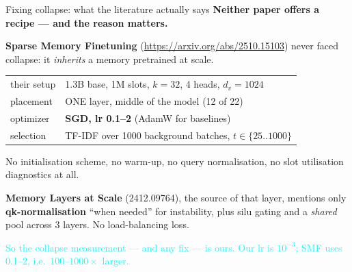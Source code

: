 \documentclass{beamer}
\newcommand{\pierre}[1]{\textcolor{cyan}{#1}}
\begin{document}
\begin{frame}{Fixing collapse: what the literature actually says}
\textbf{Neither paper offers a recipe --- and the reason matters.}

\medskip
\textbf{Sparse Memory Finetuning} (\url{https://arxiv.org/abs/2510.15103}) never
faced collapse: it \emph{inherits} a memory pretrained at scale.
\begin{center}
\begin{tabular}{|l|l|}
\hline
their setup & 1.3B base, 1M slots, $k{=}32$, 4 heads, $d_v{=}1024$ \\
placement & ONE layer, middle of the model (12 of 22) \\
optimizer & \textbf{SGD, lr 0.1--2} (AdamW for baselines) \\
selection & TF-IDF over 1000 background batches, $t \in \{25..1000\}$ \\
\hline
\end{tabular}
\end{center}
No initialisation scheme, no warm-up, no query normalisation, \alert{no slot
utilisation diagnostics at all}.

\medskip
\textbf{Memory Layers at Scale} (2412.09764), the source of that layer, mentions
only \textbf{qk-normalisation} ``when needed'' for instability, plus silu gating
and a \emph{shared} pool across 3 layers. No load-balancing loss.

\medskip
\pierre{So the collapse measurement --- and any fix --- is ours. Our lr is
$10^{-3}$; SMF uses 0.1--2, i.e.\ $100\text{--}1000\times$ larger.}
\end{frame}
\end{document}
